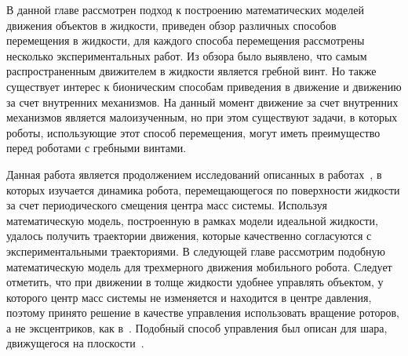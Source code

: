 В данной главе рассмотрен подход к построению математических моделей движения объектов в жидкости, приведен обзор различных способов перемещения в жидкости, для каждого способа перемещения рассмотрены несколько экспериментальных работ. Из обзора было выявлено, что самым распространенным движителем в жидкости является гребной винт. Но также существует интерес к бионическим способам приведения в движение и движению за счет внутренних механизмов. На данный момент движение за счет внутренних механизмов является малоизученным, но при этом существуют задачи, в которых роботы, использующие этот способ перемещения, могут иметь преимущество перед роботами с гребными винтами.

Данная работа является продолжением исследований описанных в работах~\cite{Klenov_diss, Klenov_Kilin_2016}, в которых изучается динамика робота, перемещающегося по поверхности жидкости за счет периодического смещения центра масс системы. Используя математическую модель, построенную в рамках модели идеальной жидкости, удалось получить траектории движения, которые качественно согласуются с экспериментальными траекториями. В следующей главе рассмотрим подобную математическую модель для трехмерного движения мобильного робота. Следует отметить, что при движении в толще жидкости удобнее управлять объектом, у которого центр масс системы не изменяется и находится в центре давления, поэтому принято решение в качестве управления использовать вращение роторов, а не эксцентриков, как в~\cite{Klenov_diss, Klenov_Kilin_2016}. Подобный способ управления был описан для шара, движущегося на плоскости~\cite{BKM_Chapligin1, BKM_Chapligin2}.



